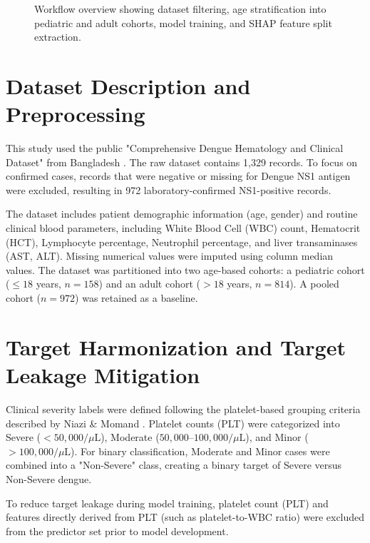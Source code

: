 \documentclass[12pt, a4paper]{report}
\begin{document}
\begin{figure}[htbp]
    \centering
    \caption{Workflow overview showing dataset filtering, age stratification into pediatric and adult cohorts, model training, and SHAP feature split extraction.}
    \label{fig:flowchart}
\end{figure}

\section{Dataset Description and Preprocessing}
This study used the public "Comprehensive Dengue Hematology and Clinical Dataset" from Bangladesh \cite{mendeley2026}. The raw dataset contains 1,329 records. To focus on confirmed cases, records that were negative or missing for Dengue NS1 antigen were excluded, resulting in 972 laboratory-confirmed NS1-positive records.

The dataset includes patient demographic information (age, gender) and routine clinical blood parameters, including White Blood Cell (WBC) count, Hematocrit (HCT), Lymphocyte percentage, Neutrophil percentage, and liver transaminases (AST, ALT). Missing numerical values were imputed using column median values. The dataset was partitioned into two age-based cohorts: a pediatric cohort ($\le 18$ years, $n=158$) and an adult cohort ($> 18$ years, $n=814$). A pooled cohort ($n=972$) was retained as a baseline.

\section{Target Harmonization and Target Leakage Mitigation}
Clinical severity labels were defined following the platelet-based grouping criteria described by Niazi \& Momand \cite{niazi2026}. Platelet counts (PLT) were categorized into Severe ($< 50,000 / \mu\text{L}$), Moderate ($50,000\text{--}100,000 / \mu\text{L}$), and Minor ($> 100,000 / \mu\text{L}$). For binary classification, Moderate and Minor cases were combined into a "Non-Severe" class, creating a binary target of Severe versus Non-Severe dengue.

To reduce target leakage during model training, platelet count (PLT) and features directly derived from PLT (such as platelet-to-WBC ratio) were excluded from the predictor set prior to model development.
\end{document}

